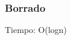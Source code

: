 \documentclass[10pt,handout]{beamer}
\begin{document}
\section{}
\begin{frame}
\frametitle{}


\end{frame}


\section{}
\begin{frame}
\frametitle{Borrado}

  Tiempo: O(logn)

\end{frame}


\section{}
\begin{frame}
\frametitle{}


\end{frame}


\section{}
\begin{frame}
\frametitle{}


\end{frame}


\section{}
\begin{frame}
\frametitle{}


\end{frame}

\end{document}
